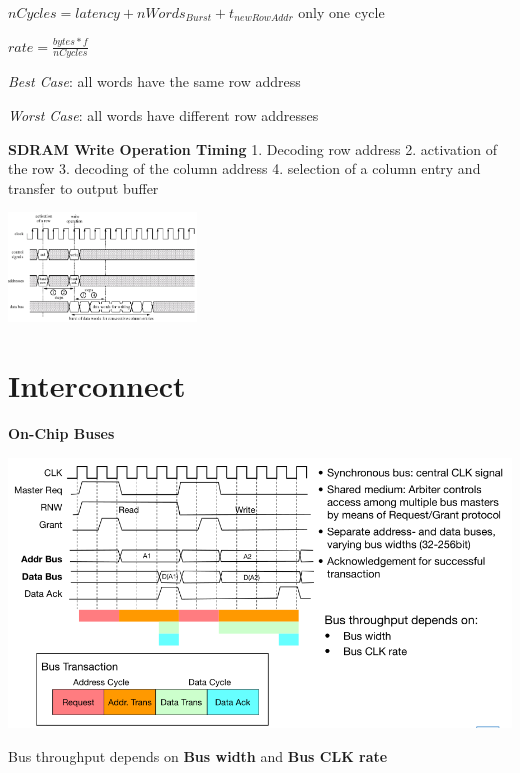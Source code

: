 \documentclass[english]{latex4ei/latex4ei_sheet}
\begin{document}
$nCycles = latency + nWords_{Burst} + t_{newRowAddr}$ \quad only one cycle

$rate = \frac{bytes * f}{nCycles}$

\textit{Best Case}: all words have the same row address

\textit{Worst Case}: all words have different row addresses

\textbf{SDRAM Write Operation Timing}
1. Decoding row address 2. activation of the row 3. decoding of the column address 4. selection of a column entry and transfer to output buffer
\begin{center}
	\includegraphics[width=5cm]{images//5.Memory/SDRAMWrite.png}
\end{center}

\section{Interconnect}

\textbf{On-Chip Buses}
\begin{center}
	\includegraphics[width=\linewidth]{images//6.Interconnects/OnChipBasicOperation.png}
\end{center}
Bus throughput depends on \textbf{Bus width} and \textbf{Bus CLK rate}
\end{document}
